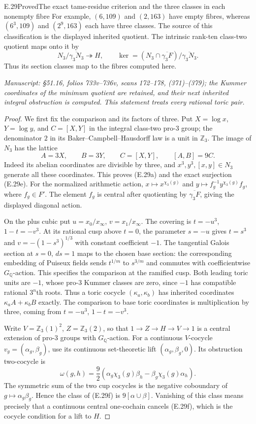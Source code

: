 \begin{statement}{E.29}{Proved}{The exact tame-residue criterion and the three classes in each nonempty fibre}
For example, $(6,109)$ and $(2,163)$ have empty fibres,
whereas $(6^3,109)$ and $(2^9,163)$ each have three classes.
The source of this classification is the displayed inherited
quotient. The intrinsic rank-ten class-two quotient maps onto
it by
\[
 N_3/\overline{\gamma_3N_3}\twoheadrightarrow H,
 \qquad
 \ker=(N_3\cap\overline{\gamma_3F})/
                     \overline{\gamma_3N_3}.                  \tag{E.29e}
\]
Thus its section classes map to the fibres computed here.

\emph{Manuscript: \S51.16, folios 733v--736v, scans 172--178,
(371)--(379); the Kummer coordinates of the minimum quotient
are retained, and their next inherited integral obstruction is
computed. This statement treats every rational toric pair.}
\end{statement}
\begin{proof}
We first fix the comparison and its factors of three. Put
$X=\log x$, $Y=\log y$, and $C=[X,Y]$ in the integral
class-two pro-$3$ group; the denominator $2$ in its
Baker--Campbell--Hausdorff law is a unit in $\mathbb Z_3$.
The image of $N_3$ has the lattice
\[
 A=3X,\qquad B=3Y,\qquad C=[X,Y],\qquad[A,B]=9C.
\]
Indeed its abelian coordinates are divisible by three,
and $x^3,y^3,[x,y]\in N_3$ generate all these coordinates.
This proves (E.29a) and the exact surjection (E.29e).
For the normalized arithmetic action,
$x\mapsto x^{\chi_3(g)}$ and
$y\mapsto f_g^{-1}y^{\chi_3(g)}f_g$, where $f_g\in F'$.
The element $f_g$ is central after quotienting by
$\overline{\gamma_3F}$, giving the displayed diagonal action.

On the plus cubic put $u=x_0/x_\infty$, $v=x_1/x_\infty$.
The covering is $t=-u^3$, $1-t=-v^3$.
At its rational cusp above $t=0$, the parameter $s=-u$ gives
$t=s^3$ and $v=-(1-s^3)^{1/3}$ with constant coefficient $-1$.
The tangential Galois section at $s=0$, $ds=1$ maps to the
chosen base section: the corresponding embedding of Puiseux
fields sends $t^{1/m}$ to $s^{3/m}$ and commutes with
coefficientwise $G_{\mathbb Q}$-action. This specifies the
comparison at the ramified cusp.
Both leading toric units are $-1$, whose pro-$3$ Kummer
classes are zero, since $-1$ has compatible rational
$3^n$th roots. Thus a toric cocycle $(\kappa_a,\kappa_b)$
has inherited coordinates $\kappa_a A+\kappa_b B$ exactly.
The comparison to base toric coordinates is multiplication
by three, coming from $t=-u^3$, $1-t=-v^3$.

Write $V=\mathbb Z_3(1)^2$, $Z=\mathbb Z_3(2)$, so that
$1\to Z\to H\to V\to1$ is a central extension of pro-$3$
groups with $G_{\mathbb Q}$-action. For a continuous
$V$-cocycle $v_g=(\alpha_g,\beta_g)$, use its continuous
set-theoretic lift $(\alpha_g,\beta_g,0)$. Its obstruction
two-cocycle is
\[
 \omega(g,h)=\frac92\left(
 \alpha_g\chi_3(g)\beta_h-
 \beta_g\chi_3(g)\alpha_h\right).                           \tag{E.29f}
\]
The symmetric sum of the two cup cocycles is the negative
coboundary of $g\mapsto\alpha_g\beta_g$. Hence the class
of (E.29f) is $9[\alpha\cup\beta]$.
Vanishing of this class means precisely that a continuous
central one-cochain cancels (E.29f), which is the cocycle
condition for a lift to $H$.


\end{proof}
